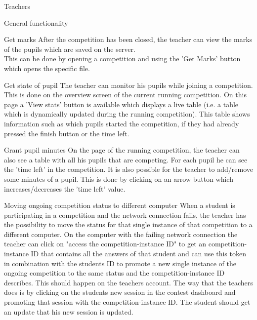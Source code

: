 \begin{section}{Teachers}
\begin{subsection}{General functionality}
        \begin{subsubsection}{Get marks}
            After the competition has been closed, the teacher can view the marks of the pupils which are saved on the server.\\
            This can be done by opening a competition and using the 'Get Marks' button which opens the specific file.
        \end{subsubsection}
        \begin{subsubsection}{Get state of pupil}
            The teacher can monitor his pupils while joining a competition. This is done on the overview screen of 		the current running competition. On this page a 'View stats' button is available which displays a live table 
            (i.e. a table which is dynamically updated during the running competition). This table shows information such as which pupils started the competition, if they had already pressed the finish button or the time left. 
        \end{subsubsection}
        \begin{subsubsection}{Grant pupil minutes}
            On the page of the running competition, the teacher can also see a table with all his pupils that are competing. For each pupil he can see the 'time left' in the competition. It is also 		possible for the teacher to add/remove some minutes of a pupil. This is done by clicking on an arrow button which increases/decreases the 'time left' value.
        \end{subsubsection}
        \begin{subsubsection}{Moving ongoing competition status to different computer}
            When a student is participating in a competition and the network connection fails, the teacher has the possibility to move the status for that single instance of that competition to a different computer. On the computer with the failing network connection the teacher can click on "access the competition-instance ID" to get an competition-instance ID that contains all the answers of that student and can use this token in combination with the students ID to promote a new single instance of the ongoing competition to the same status and the competition-instance ID describes. This should happen on the teachers account. The way that the teachers does is by clicking on the students new session in the contest dashboard and promoting that session with the competition-instance ID. The student should get an update that his new session is updated. 
        \end{subsubsection}


\end{subsection}
\end{section}
